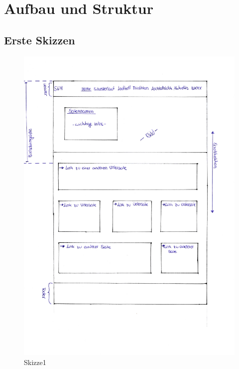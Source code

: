 \documentclass[12pt,a4paper]{article}
\begin{document}
\newpage
\section{Aufbau und Struktur}
\subsection{Erste Skizzen}
\begin{figure}[!htbp]
	\includegraphics[scale=0.75]{Skizze01.pdf}
	\caption{Skizze1}
	\label{img:Skizze1}
\end{figure}
\newpage
\end{document}
